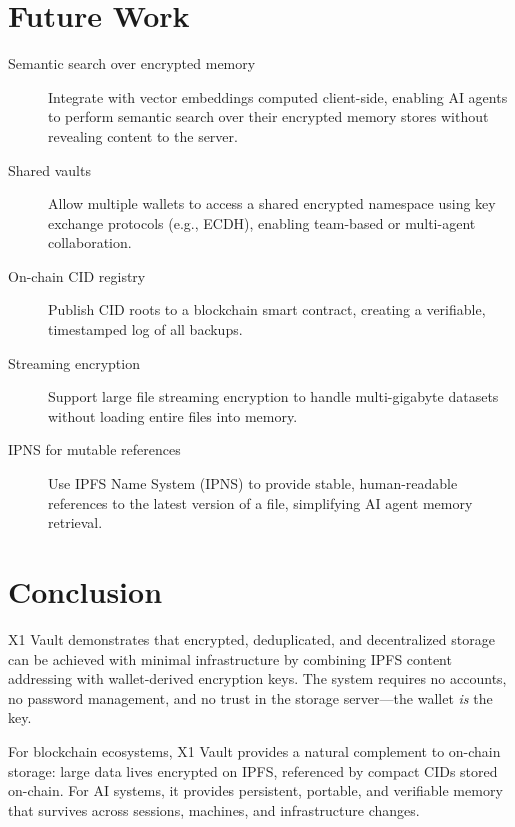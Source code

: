 \documentclass[11pt,a4paper]{article}
\begin{document}
\section{Future Work}

\begin{description}
    \item[Semantic search over encrypted memory] Integrate with vector embeddings computed client-side, enabling AI agents to perform semantic search over their encrypted memory stores without revealing content to the server.

    \item[Shared vaults] Allow multiple wallets to access a shared encrypted namespace using key exchange protocols (e.g., ECDH), enabling team-based or multi-agent collaboration.

    \item[On-chain CID registry] Publish CID roots to a blockchain smart contract, creating a verifiable, timestamped log of all backups.

    \item[Streaming encryption] Support large file streaming encryption to handle multi-gigabyte datasets without loading entire files into memory.

    \item[IPNS for mutable references] Use IPFS Name System (IPNS) to provide stable, human-readable references to the latest version of a file, simplifying AI agent memory retrieval.
\end{description}

\section{Conclusion}

X1 Vault demonstrates that encrypted, deduplicated, and decentralized storage can be achieved with minimal infrastructure by combining IPFS content addressing with wallet-derived encryption keys. The system requires no accounts, no password management, and no trust in the storage server---the wallet \textit{is} the key.

For blockchain ecosystems, X1 Vault provides a natural complement to on-chain storage: large data lives encrypted on IPFS, referenced by compact CIDs stored on-chain. For AI systems, it provides persistent, portable, and verifiable memory that survives across sessions, machines, and infrastructure changes.
\end{document}
